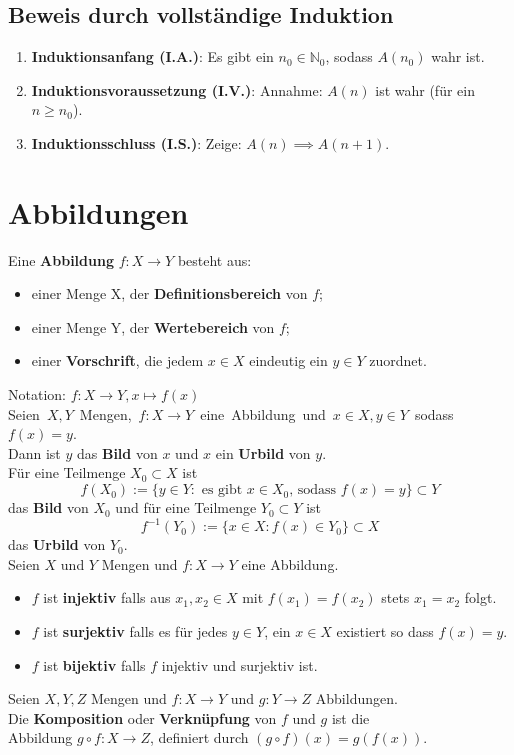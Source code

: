 \documentclass[12pt]{article}
\begin{document}
\subsection{Beweis durch vollständige Induktion}
\begin{enumerate}
    \item \textbf{Induktionsanfang (I.A.)}: Es gibt ein $n_0 \in \mathbb{N}_0$, sodass $A(n_0)$ wahr ist.
    \item \textbf{Induktionsvoraussetzung (I.V.)}: Annahme: $A(n)$ ist wahr (für ein $n \geq n_0$).
    \item \textbf{Induktionsschluss (I.S.)}: Zeige: $A(n) \implies A(n+1)$.
\end{enumerate}

\newpage
\section{Abbildungen}
Eine \textbf{Abbildung} $f: X \to Y$ besteht aus:
\begin{itemize}
    \item einer Menge X, der \textbf{Definitionsbereich} von $f$;
    \item einer Menge Y, der \textbf{Wertebereich} von $f$;
    \item einer \textbf{Vorschrift}, die jedem $x \in X$ eindeutig ein $y \in Y$ zuordnet.
\end{itemize}
Notation: $f: X \to Y, x \mapsto f(x)$ \\ 
\newline
\hbox{Seien $X, Y$ Mengen, $f: X \to Y$ eine Abbildung und $x \in X, y \in Y$ sodass $f(x)=y$.} \\
Dann ist $y$ das \textbf{Bild} von $x$ und $x$ ein \textbf{Urbild} von $y$.\\
Für eine Teilmenge $X_0 \subset X$ ist
\[f(X_0) := \{y \in Y: \text{ es gibt } x \in X_0 \text{, sodass } f(x)=y\} \subset Y\]
das \textbf{Bild} von $X_0$ und für eine Teilmenge $Y_0 \subset Y$ ist
\[f^{-1}(Y_0) := \{x \in X : f(x) \in Y_0\} \subset X\]
das \textbf{Urbild} von $Y_0$. \\ 
\newline
Seien $X$ und $Y$ Mengen und $f: X \to Y$ eine Abbildung.
\begin{itemize}
    \item[] $f$ ist \textbf{injektiv} falls aus $x_1,x_2 \in X$ mit $f(x_1) = f(x_2)$ stets $x_1 = x_2$ folgt.
    \item[] $f$ ist \textbf{surjektiv} falls es für jedes $y \in Y$, ein $x \in X$ existiert so dass $f(x) = y$.
    \item[] $f$ ist \textbf{bijektiv} falls $f$ injektiv und surjektiv ist.
\end{itemize}
Seien $X, Y, Z$ Mengen und $f: X \to Y$ und $g: Y \to Z$ Abbildungen.\\
Die \textbf{Komposition} oder \textbf{Verknüpfung} von $f$ und $g$ ist die\\
Abbildung $g \circ f: X \to Z$, definiert durch $(g \circ f)(x)=g(f(x))$.
\end{document}
